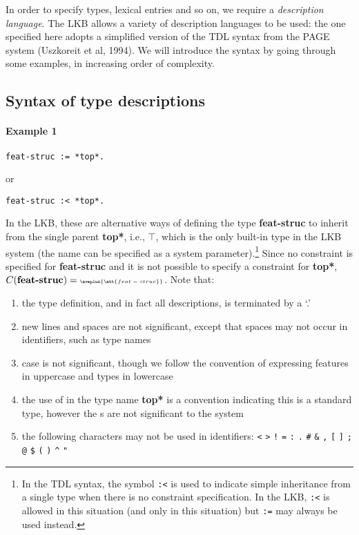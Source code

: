 \documentclass[12pt]{report}
\begin{document}
In order to specify types, lexical entries and so on, we require
a {\it description language}.
The LKB allows a variety of description languages to be used: the one
specified here adopts a simplified version of the TDL syntax from the PAGE
system (Uszkoreit et al, 1994).
We will introduce the syntax by
going through some examples, in increasing order of complexity.

\subsection{Syntax of type descriptions}
\label{typesyntax}

\paragraph{Example 1}

\begin{verbatim}
feat-struc := *top*.
\end{verbatim}
or
\begin{verbatim}
feat-struc :< *top*.
\end{verbatim}
In the LKB, these are alternative ways of defining 
the type {\bf feat-struc} to inherit from the single
parent {\bf *top*}, i.e., $\top$,
which is the only built-in type 
in the LKB system (the name can be specified as a 
system parameter).\footnote{In the TDL syntax, the symbol {\tt :<} is 
used to indicate simple inheritance
from a single type when there is no constraint specification.
In the LKB, {\tt :<} is allowed in this situation (and only in this situation)
but {\tt :=} may always be used instead.}
Since no constraint is specified for {\bf feat-struc} and it is
not possible to specify a constraint for {\bf *top*},
$C(\mbox{\bf feat-struc})= \mbox{\tiny $\avmplus{\att{feat-struc}}$}$.
Note that:
\begin{enumerate}
\item the type definition, and in fact all descriptions,  is terminated by a `.'
\item new lines and spaces are not significant, except that spaces
may not occur in identifiers, such as type names
\item case is not significant, though we follow the
convention of expressing features in uppercase and types in lowercase
\item the use of {\tt *} in the type name {\bf *top*} is a convention
indicating this is a standard type, however the {\tt *}s are not significant
to the system
\item  the following characters may not be used in identifiers:
{\tt <} {\tt >} {\tt !} {\tt =} {\tt :} 
{\tt .} {\tt \#} {\tt \&} {\tt ,} {\tt [}
{\tt ]} {\tt ;} {\tt @} {\tt \$} {\tt (} {\tt )} {\tt \verb+^+} {\tt "}
\end{enumerate}
\end{document}
